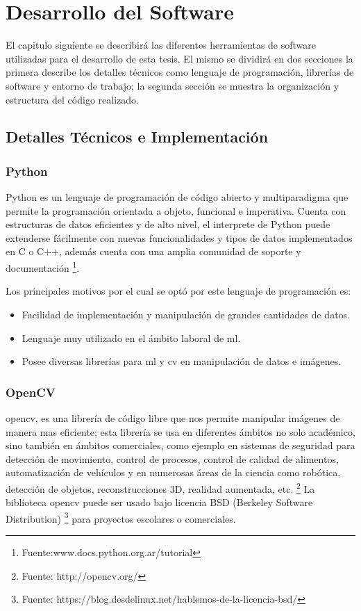 \section{Desarrollo del Software}\label{sec:Desarrollo}

El capitulo siguiente se describirá las diferentes herramientas de software utilizadas para el desarrollo de esta tesis. El mismo se dividirá en dos secciones la primera describe los detalles técnicos como lenguaje de programación, librerías de software y entorno de trabajo; la segunda sección se muestra la organización y estructura del código realizado.


\subsection{Detalles Técnicos e Implementación}\label{sec:implementacion}

\subsubsection*{Python}
Python es un lenguaje de programación de código abierto y multiparadigma que permite la programación orientada a objeto, funcional e imperativa. 
Cuenta con estructuras de datos eficientes y de alto nivel, el interprete de Python puede extenderse fácilmente  con nuevas funcionalidades y tipos 
de  datos implementados en C o C++, además cuenta con una amplia comunidad de soporte y 
documentación \footnote{Fuente:www.docs.python.org.ar/tutorial}. 

Los principales motivos por el cual se optó por este lenguaje de programación es:
\begin{itemize}
 \item Facilidad de implementación y manipulación de grandes cantidades de datos.
 \item Lenguaje muy utilizado en el ámbito laboral de \ac{ml}.
 \item Posee diversas librerías para \ac{ml} y \ac{cv} en manipulación de datos e imágenes.
\end{itemize}


\subsubsection*{OpenCV}
\ac{opencv}, es una librería de código libre que nos permite manipular imágenes de manera mas eficiente; esta librería se usa en diferentes ámbitos no solo académico, sino también en ámbitos comerciales, como ejemplo en sistemas de seguridad para detección de movimiento, control de procesos, control de calidad de alimentos, automatización de vehículos y en numerosas áreas de la ciencia como robótica, detección de objetos, reconstrucciones 3D, realidad aumentada, etc. \footnote{Fuente: http://opencv.org/} La biblioteca \ac{opencv} puede ser usado bajo licencia BSD (Berkeley Software Distribution) \footnote{Fuente: https://blog.desdelinux.net/hablemos-de-la-licencia-bsd/ } para proyectos escolares o comerciales. 

